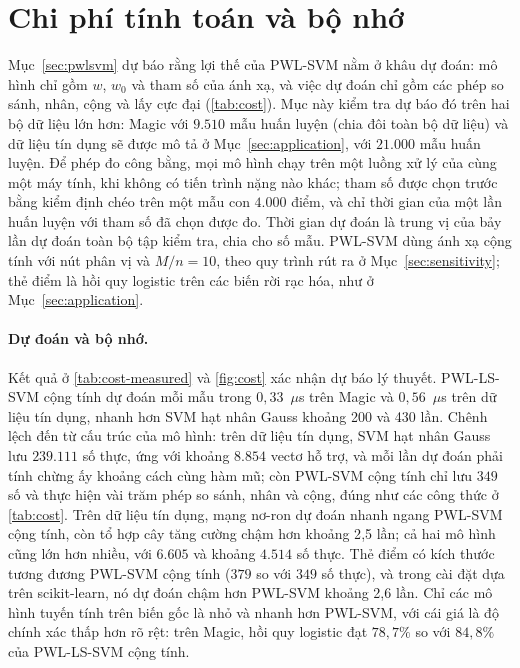 \section{Chi phí tính toán và bộ nhớ}\label{sec:cost}

Mục~\ref{sec:pwlsvm} dự báo rằng lợi thế của PWL-SVM nằm ở khâu dự đoán: mô hình chỉ gồm $w$, $w_0$ và tham số của ánh xạ, và việc dự đoán chỉ gồm các phép so sánh, nhân, cộng và lấy cực đại (\cref{tab:cost}). Mục này kiểm tra dự báo đó trên hai bộ dữ liệu lớn hơn: Magic với $9.510$ mẫu huấn luyện (chia đôi toàn bộ dữ liệu) và dữ liệu tín dụng sẽ được mô tả ở Mục~\ref{sec:application}, với $21.000$ mẫu huấn luyện. Để phép đo công bằng, mọi mô hình chạy trên một luồng xử lý của cùng một máy tính, khi không có tiến trình nặng nào khác; tham số được chọn trước bằng kiểm định chéo trên một mẫu con $4.000$ điểm, và chỉ thời gian của một lần huấn luyện với tham số đã chọn được đo. Thời gian dự đoán là trung vị của bảy lần dự đoán toàn bộ tập kiểm tra, chia cho số mẫu. PWL-SVM dùng ánh xạ cộng tính với nút phân vị và $M/n=10$, theo quy trình rút ra ở Mục~\ref{sec:sensitivity}; thẻ điểm là hồi quy logistic trên các biến rời rạc hóa, như ở Mục~\ref{sec:application}.


\paragraph{Dự đoán và bộ nhớ.} Kết quả ở \cref{tab:cost-measured} và \cref{fig:cost} xác nhận dự báo lý thuyết. PWL-LS-SVM cộng tính dự đoán mỗi mẫu trong $0{,}33$~$\mu$s trên Magic và $0{,}56$~$\mu$s trên dữ liệu tín dụng, nhanh hơn SVM hạt nhân Gauss khoảng 200 và 430 lần. Chênh lệch đến từ cấu trúc của mô hình: trên dữ liệu tín dụng, SVM hạt nhân Gauss lưu $239.111$ số thực, ứng với khoảng $8.854$ vectơ hỗ trợ, và mỗi lần dự đoán phải tính chừng ấy khoảng cách cùng hàm mũ; còn PWL-SVM cộng tính chỉ lưu $349$ số và thực hiện vài trăm phép so sánh, nhân và cộng, đúng như các công thức ở \cref{tab:cost}. Trên dữ liệu tín dụng, mạng nơ-ron dự đoán nhanh ngang PWL-SVM cộng tính, còn tổ hợp cây tăng cường chậm hơn khoảng 2{,}5 lần; cả hai mô hình cũng lớn hơn nhiều, với $6.605$ và khoảng $4.514$ số thực. Thẻ điểm có kích thước tương đương PWL-SVM cộng tính ($379$ so với $349$ số thực), và trong cài đặt dựa trên scikit-learn, nó dự đoán chậm hơn PWL-SVM khoảng 2{,}6 lần. Chỉ các mô hình tuyến tính trên biến gốc là nhỏ và nhanh hơn PWL-SVM, với cái giá là độ chính xác thấp hơn rõ rệt: trên Magic, hồi quy logistic đạt $78{,}7\%$ so với $84{,}8\%$ của PWL-LS-SVM cộng tính.

